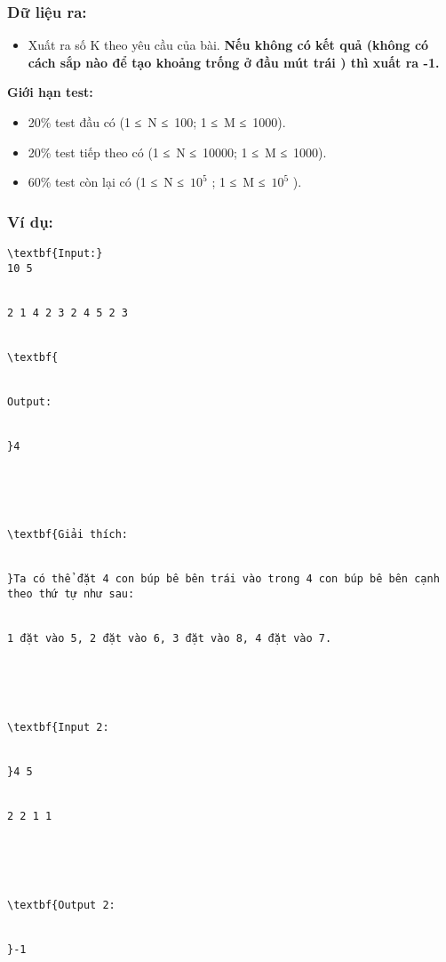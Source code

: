 \subsubsection{   Dữ liệu ra:  }
\begin{itemize}
	\item     Xuất ra số K theo yêu cầu của bài.    \textbf{     Nếu không có kết quả (không có cách sắp nào để tạo khoảng trống ở đầu mút trái ) thì xuất ra -1.    }
\end{itemize}

\textbf{     Giới hạn test:    }
\begin{itemize}
	\item      20\% test đầu có (1 ≤ N ≤ 100; 1 ≤ M ≤ 1000).    
	\item      20\% test tiếp theo có           (1 ≤ N ≤ 10000; 1 ≤ M ≤ 1000).     
	\item        60\% test còn lại có (1 ≤ N ≤ $10^{5}$       ; 1 ≤ M ≤ $10^{5}$       ).      
\end{itemize}
\begin{itemize}
\end{itemize}

\subsubsection{   Ví dụ:  }
\begin{verbatim}
\textbf{Input:}
10 5


2 1 4 2 3 2 4 5 2 3


\textbf{


Output:


}4





\textbf{Giải thích: 


}Ta có thể đặt 4 con búp bê bên trái vào trong 4 con búp bê bên cạnh theo thứ tự như sau: 


1 đặt vào 5, 2 đặt vào 6, 3 đặt vào 8, 4 đặt vào 7.





\textbf{Input 2:


}4 5


2 2 1 1





\textbf{Output 2:


}-1








\end{verbatim}
